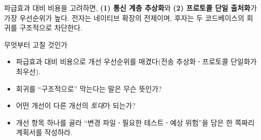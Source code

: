 \begin{infobox}[title=우선순위 제언]
파급효과 대비 비용을 고려하면, \textbf{(1) 통신 계층 추상화}와
\textbf{(2) 프로토콜 단일 출처화}가 가장 우선순위가 높다. 전자는 네이티브
확장의 전제이며, 후자는 두 코드베이스의 회귀를 구조적으로 차단한다.
\end{infobox}

\begin{teachbox}{무엇부터 고칠 것인가}
\begin{itemize}
  \item 파급효과 대비 비용으로 개선 우선순위를 매겼다(전송 추상화\textbf{·}프로토콜 단일화가 최우선).
\end{itemize}
\begin{itemize}
  \item 회귀를 ``구조적으로'' 막는다는 말은 무슨 뜻인가?
  \item 어떤 개선이 다른 개선의 \emph{토대}가 되는가?
\end{itemize}
\begin{itemize}
  \item 개선 항목 하나를 골라 ``변경 파일\textbf{·}필요한 테스트\textbf{·}예상 위험''을 담은 한 쪽짜리 계획서를 작성하라.
\end{itemize}
\end{teachbox}

